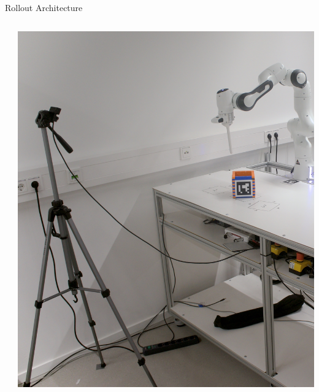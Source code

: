 \documentclass[16:9,en,navbarinfooter]{sdqbeamer}
\begin{document}
\begin{frame}{Rollout Architecture}
\begin{columns}
\begin{column}{0.45\textwidth}
		\end{column}
		\begin{column}{0.35\textwidth}
			\vspace{1cm}
			\includegraphics[width=\linewidth]{media/labsetup2.jpg}

		\end{column}
	\end{columns}

\end{frame}


\backupend{}
\end{document}
